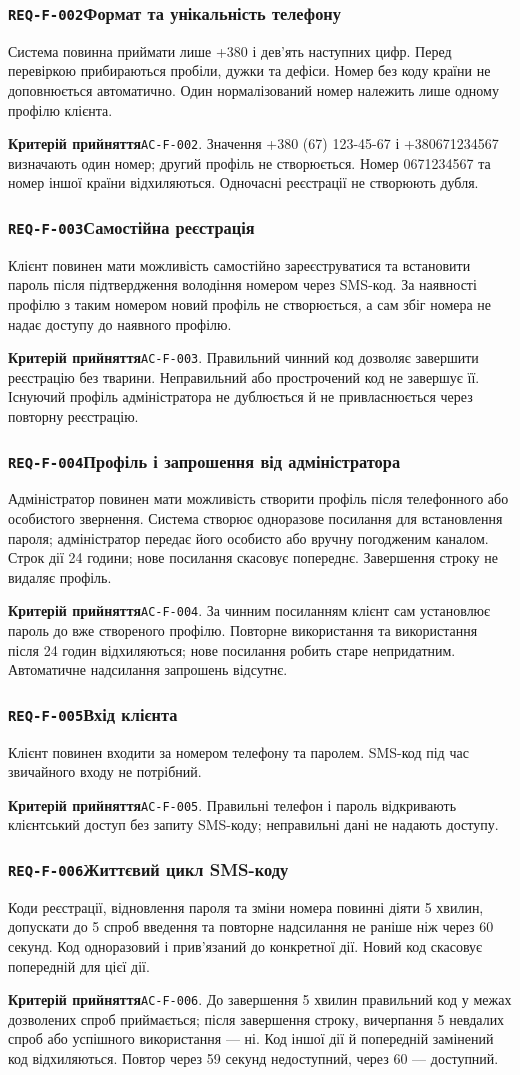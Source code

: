 \documentclass[11pt,a4paper]{article}
\newcommand{\requirement}[4]{%
  \Needspace{7\baselineskip}%
  \subsubsection*{\hypertarget{#1}{\texttt{#1}}\quad #2}%
  #3\par
  \textbf{Критерій прийняття}\quad #4\par\medskip}
\begin{document}
\requirement{REQ-F-002}{Формат та унікальність телефону}{Система повинна приймати лише +380 і дев’ять наступних цифр. Перед перевіркою прибираються пробіли, дужки та дефіси. Номер без коду країни не доповнюється автоматично. Один нормалізований номер належить лише одному профілю клієнта.}{\hypertarget{AC-F-002}{\texttt{AC-F-002}}. Значення +380 (67) 123-45-67 і +380671234567 визначають один номер; другий профіль не створюється. Номер 0671234567 та номер іншої країни відхиляються. Одночасні реєстрації не створюють дубля.}

\requirement{REQ-F-003}{Самостійна реєстрація}{Клієнт повинен мати можливість самостійно зареєструватися та встановити пароль після підтвердження володіння номером через SMS-код. За наявності профілю з таким номером новий профіль не створюється, а сам збіг номера не надає доступу до наявного профілю.}{\hypertarget{AC-F-003}{\texttt{AC-F-003}}. Правильний чинний код дозволяє завершити реєстрацію без тварини. Неправильний або прострочений код не завершує її. Існуючий профіль адміністратора не дублюється й не привласнюється через повторну реєстрацію.}

\requirement{REQ-F-004}{Профіль і запрошення від адміністратора}{Адміністратор повинен мати можливість створити профіль після телефонного або особистого звернення. Система створює одноразове посилання для встановлення пароля; адміністратор передає його особисто або вручну погодженим каналом. Строк дії 24 години; нове посилання скасовує попереднє. Завершення строку не видаляє профіль.}{\hypertarget{AC-F-004}{\texttt{AC-F-004}}. За чинним посиланням клієнт сам установлює пароль до вже створеного профілю. Повторне використання та використання після 24 годин відхиляються; нове посилання робить старе непридатним. Автоматичне надсилання запрошень відсутнє.}

\requirement{REQ-F-005}{Вхід клієнта}{Клієнт повинен входити за номером телефону та паролем. SMS-код під час звичайного входу не потрібний.}{\hypertarget{AC-F-005}{\texttt{AC-F-005}}. Правильні телефон і пароль відкривають клієнтський доступ без запиту SMS-коду; неправильні дані не надають доступу.}

\requirement{REQ-F-006}{Життєвий цикл SMS-коду}{Коди реєстрації, відновлення пароля та зміни номера повинні діяти 5 хвилин, допускати до 5 спроб введення та повторне надсилання не раніше ніж через 60 секунд. Код одноразовий і прив’язаний до конкретної дії. Новий код скасовує попередній для цієї дії.}{\hypertarget{AC-F-006}{\texttt{AC-F-006}}. До завершення 5 хвилин правильний код у межах дозволених спроб приймається; після завершення строку, вичерпання 5 невдалих спроб або успішного використання — ні. Код іншої дії й попередній замінений код відхиляються. Повтор через 59 секунд недоступний, через 60 — доступний.}
\end{document}
